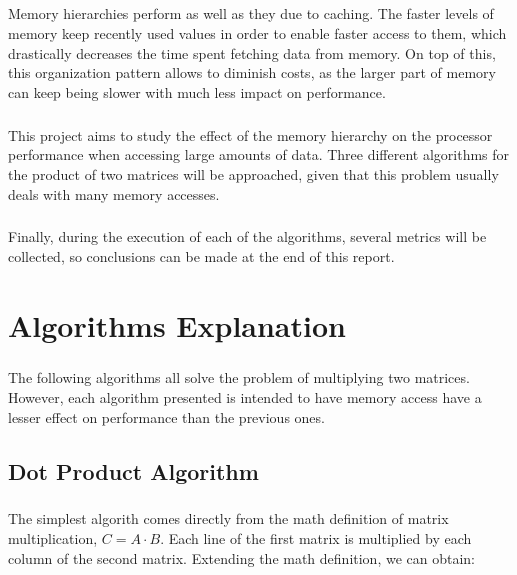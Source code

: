 \documentclass{report}
\begin{document}
			\paragraph{}Memory hierarchies perform as well as they due to caching. The faster levels of memory keep recently used values in order to enable faster access to them, which drastically decreases the time spent fetching data from memory. On top of this, this organization pattern allows to diminish costs, as the larger part of memory can keep being slower with much less impact on performance.
			
			\paragraph{} This project aims to study the effect of the memory hierarchy on the processor performance when accessing large amounts of data. Three different algorithms for the product of two matrices will be approached, given that this problem usually deals with many memory accesses. 
			
			\paragraph{}Finally, during the execution of each of the algorithms, several metrics will be collected, so conclusions can be made at the end of this report.
			
			
	\chapter{Algorithms Explanation}
	
		\paragraph{}The following algorithms all solve the problem of multiplying two matrices. However, each algorithm presented is intended to have memory access have a lesser effect on performance than the previous ones. 
	
		\section{Dot Product Algorithm}
		
			\paragraph{}The simplest algorith comes directly from the math definition of matrix multiplication, $C = A \cdot B$. Each line of the first matrix is multiplied by each column of the second matrix. Extending the math definition, we can obtain:
			
\end{document}
